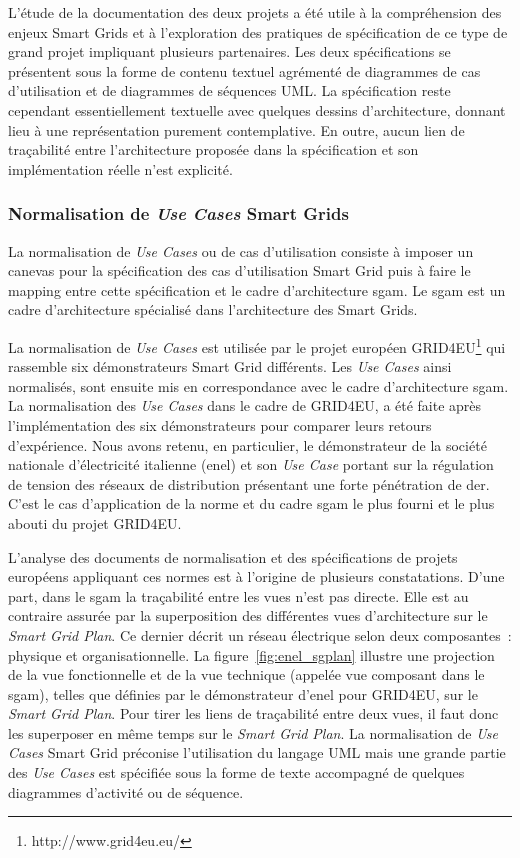 L'étude de la documentation des deux projets a été utile à la compréhension des
enjeux Smart Grids et à l'exploration des pratiques de spécification de ce type
de grand projet impliquant plusieurs partenaires. Les deux spécifications se
présentent sous la forme de contenu textuel agrémenté de diagrammes de cas
d'utilisation et de diagrammes de séquences UML. La spécification reste
cependant essentiellement textuelle avec quelques dessins d'architecture, donnant
lieu à une représentation purement contemplative. En outre, aucun lien de
traçabilité entre l'architecture proposée dans la spécification et son
implémentation réelle n'est explicité.

\subsubsection{Normalisation de \textit{Use Cases} Smart Grids}
\label{sec:ENEL}

La normalisation de \textit{Use Cases} ou de cas d'utilisation consiste à
imposer un canevas pour la spécification des cas d'utilisation Smart Grid puis à
faire le mapping entre cette spécification et le cadre d'architecture
\gls{sgam}. Le \gls{sgam} est un cadre d'architecture spécialisé dans l'architecture des Smart Grids.

La normalisation de \textit{Use Cases} est utilisée par le projet européen
GRID4EU\footnote{http://www.grid4eu.eu/} qui rassemble six démonstrateurs Smart
Grid différents. Les \textit{Use Cases} ainsi normalisés, sont ensuite mis en
correspondance avec le cadre d'architecture \gls{sgam}. La normalisation des \textit{Use
Cases} dans le cadre de GRID4EU, a été faite après l'implémentation des six
démonstrateurs pour comparer leurs retours d'expérience. Nous avons retenu, en
particulier, le démonstrateur de la société nationale d'électricité italienne
(\gls{enel}) et son \textit{Use Case} portant sur la régulation de tension des réseaux de
distribution présentant une forte pénétration de \gls{der}. C'est le cas d'application
de la norme et du cadre \gls{sgam} le plus fourni et le plus abouti du projet GRID4EU.

L'analyse des documents de normalisation et des spécifications de projets
européens appliquant ces normes est à l'origine de plusieurs constatations.
D'une part, dans le \gls{sgam} la traçabilité entre les vues n'est pas directe.
Elle est au contraire assurée par la superposition des différentes vues
d'architecture sur le \textit{Smart Grid Plan}. Ce dernier décrit un réseau
électrique selon deux composantes~: physique et organisationnelle. La
figure~\ref{fig:enel_sgplan} illustre une projection de la vue fonctionnelle et
de la vue technique (appelée vue composant dans le \gls{sgam}), telles que
définies par le démonstrateur d'\gls{enel} pour GRID4EU, sur le \textit{Smart
Grid Plan}. Pour tirer les liens de traçabilité entre deux vues, il faut donc
les superposer en même temps sur le \textit{Smart Grid Plan}. La normalisation
de \textit{Use Cases} Smart Grid préconise l'utilisation du langage UML mais une
grande partie des \textit{Use Cases} est spécifiée sous la forme de texte
accompagné de quelques diagrammes d'activité ou de séquence.


